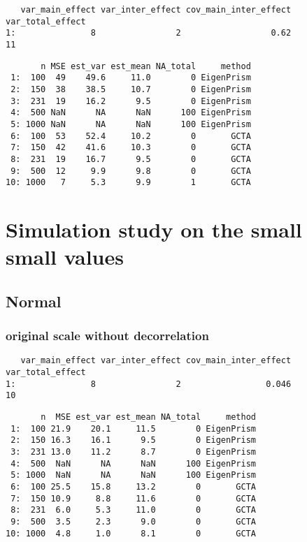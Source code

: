 \documentclass[]{article}
\begin{document}
\begin{verbatim}
   var_main_effect var_inter_effect cov_main_inter_effect var_total_effect
1:               8                2                  0.62               11
\end{verbatim}

\begin{verbatim}
       n MSE est_var est_mean NA_total     method
 1:  100  49    49.6     11.0        0 EigenPrism
 2:  150  38    38.5     10.7        0 EigenPrism
 3:  231  19    16.2      9.5        0 EigenPrism
 4:  500 NaN      NA      NaN      100 EigenPrism
 5: 1000 NaN      NA      NaN      100 EigenPrism
 6:  100  53    52.4     10.2        0       GCTA
 7:  150  42    41.6     10.3        0       GCTA
 8:  231  19    16.7      9.5        0       GCTA
 9:  500  12     9.9      9.8        0       GCTA
10: 1000   7     5.3      9.9        1       GCTA
\end{verbatim}

\section{Simulation study on the small small
values}\label{simulation-study-on-the-small-small-values}

\subsection{Normal}\label{normal}

\subsubsection{original scale without
decorrelation}\label{original-scale-without-decorrelation-2}

\begin{verbatim}
   var_main_effect var_inter_effect cov_main_inter_effect var_total_effect
1:               8                2                 0.046               10
\end{verbatim}

\begin{verbatim}
       n  MSE est_var est_mean NA_total     method
 1:  100 21.9    20.1     11.5        0 EigenPrism
 2:  150 16.3    16.1      9.5        0 EigenPrism
 3:  231 13.0    11.2      8.7        0 EigenPrism
 4:  500  NaN      NA      NaN      100 EigenPrism
 5: 1000  NaN      NA      NaN      100 EigenPrism
 6:  100 25.5    15.8     13.2        0       GCTA
 7:  150 10.9     8.8     11.6        0       GCTA
 8:  231  6.0     5.3     11.0        0       GCTA
 9:  500  3.5     2.3      9.0        0       GCTA
10: 1000  4.8     1.0      8.1        0       GCTA
\end{verbatim}
\end{document}
